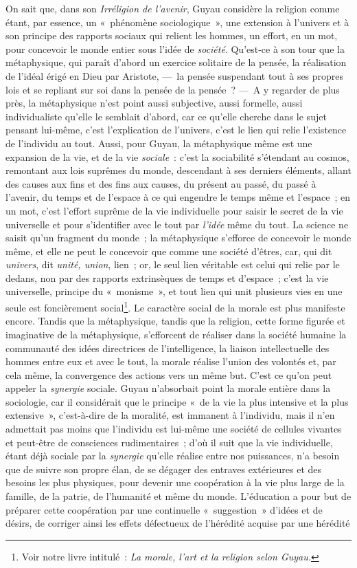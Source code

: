 \documentclass[french,twoside]{book} %
\begin{document}
On sait que, dans son \emph{Irréligion de l’avenir}, Guyau considère la religion comme étant, par essence, un « phénomène sociologique », une extension à l’univers et à son principe des rapports sociaux qui relient les hommes, un effort, en un mot, pour concevoir le monde entier sous l’idée de \emph{société}. Qu’est-ce à son tour que la métaphysique, qui paraît d’abord un exercice solitaire de la pensée, la réalisation de l’idéal érigé en Dieu par Aristote, — la pensée suspendant tout à ses propres lois et se repliant sur soi dans la pensée de la pensée ? — A y regarder de plus près, la métaphysique n’est point aussi subjective, aussi formelle, aussi individualiste qu’elle le semblait d’abord, car ce qu’elle cherche dans le sujet pensant lui-même, c’est l’explication de l’univers, c’est le lien qui relie l’existence de l’individu au tout. Aussi, pour Guyau, la métaphysique même est une expansion de la vie, et de la vie \emph{sociale} : c’est la sociabilité s’étendant au cosmos, remontant aux lois suprêmes du monde, descendant à ses derniers éléments, allant des causes aux fins et des fins aux causes, du présent au passé, du passé à l’avenir, du temps et de l’espace à ce qui engendre le temps même et l’espace ; en un mot, c’est l’effort suprême de la vie individuelle pour saisir le secret de la vie universelle et pour s’identifier avec le tout par \emph{l’idée} même du tout. La science ne saisit qu’un fragment du monde ; la métaphysique s’efforce de concevoir le monde même, et elle ne peut le concevoir que comme une société d’êtres, car, qui dit \emph{univers}, dit \emph{unité, union}, lien ; or, le seul lien véritable est celui qui relie par le dedans, non par des rapports extrinsèques de temps et d’espace ; c’est la vie universelle, principe du « monisme », et tout lien qui unit plusieurs vies en une seule est foncièrement social\footnote{ Voir notre livre intitulé : {\itshape La morale, l’art et la religion selon Guyau.}}. Le caractère social de la morale est plus manifeste encore. Tandis que la métaphysique, tandis que la religion, cette forme figurée et imaginative de la métaphysique, s’efforcent de réaliser dans la société humaine la communauté des idées directrices de l’intelligence, la liaison intellectuelle des hommes entre eux et avec le tout, la morale réalise l’union des volontés et, par cela même, la convergence des actions vers un même but. C’est ce qu’on peut appeler la \emph{synergie} sociale. Guyau n’absorbait point la morale entière dans la sociologie, car il considérait que le principe « de la vie la plus intensive et la plus extensive », c’est-à-dire de la moralité, est immanent à l’individu, mais il n’en admettait pas moins que l’individu est lui-même une société de cellules vivantes et peut-être de consciences rudimentaires ; d’où il suit que la vie individuelle, étant déjà sociale par la \emph{synergie} qu’elle réalise entre nos puissances, n’a besoin que de suivre son propre élan, de se dégager des entraves extérieures et des besoins les plus physiques, pour devenir une coopération à la vie plus large de la famille, de la patrie, de l’humanité et même du monde. L’éducation a pour but de préparer cette coopération par une continuelle « suggestion » d’idées et de désirs, de corriger ainsi les effets défectueux de l’hérédité acquise par une hérédité 
\end{document}
